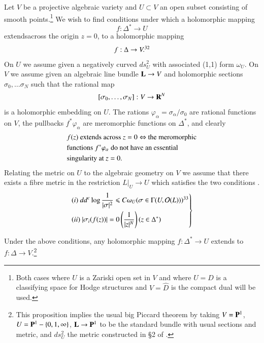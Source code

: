 Let $V$ be a projective algebraic variety and $U \subset V$ an open subset consisting of smooth points.\footnote[31]{Both cases where $U$ is a Zariski open set in $V$ and where $U = D$ is a classifying space for Hodge structures and $V = \hat{D}$ is the compact dual will be used.} We wish to find conditions under which a holomorphic mapping
$$
f : \Delta^\ast \to U
$$
extends\pageoriginale across the origin $z =0$, to a holomorphic mapping
$$
f: \Delta \to V.\footnotemark[32]{}
$$
On $U$ we assume given a negatively curved $ds^2_U$ with associated (1,1) form $\omega_U$. On $V$ we assume given an algebraic line bundle $\mathbf{L} \to V$ and holomorphic sections $\sigma_0, \ldots \sigma_N$ such that the rational map
$$
[\sigma_0, \ldots, \sigma_N]: V \to\mathbf{R}^N
$$
is a holomorphic embedding on $U$. The rations $\varphi_\alpha = \sigma_\alpha / \sigma_0$ are rational functions on $V$, the pullbacks $f^\ast \varphi_\alpha$ are meromorphic functions on $\Delta^\ast$, and clearly
\setcounter{equation}{0}
\begin{align}
& \text{$f(z)$ extends across $z = 0  \Leftrightarrow$ the meromorphic} \notag\\
& \text{functions $f^\ast\varphi_\alpha$ do not have an essential}\notag\\
& \text{singularity at $z = 0$.} \label{art4-eq8.1}
\end{align}
Relating the metric on $U$ to the algebraic geometry on $V$ we assume that there exists a fibre metric in the restriction $L|_U \to U$ which satisfies the two conditions 
.
\begin{equation}
\left.
\begin{aligned}
&  (i)~ dd^c \log \frac{1}{|\sigma|^2} \leqslant C \omega_U (\sigma \in \Gamma (U, \cO (L)))\footnotemark[33]{}\\
& (ii)~ |\sigma_i (f(z))| = 0 \left(\frac{1}{|z|^N} \right) (z \in \Delta^\ast)
\end{aligned}
\right\} \label{art4-eq8.2}
\end{equation}

\begin{proposition}\label{art4-prop8.3}
Under the above conditions, any holomorphic mapping $f : \Delta^\ast \to U$ extends to $f : \Delta \to V$.\footnote[34]{This proposition implies the usual big Piccard theorem by taking $V = \mathbf{P}^1$, $U= \mathbf{P}^1 - \{0, 1, \infty\}$, $\mathbf{L} \to \mathbf{P}^1$ to be the standard bundle with usual sections and metric, and $ds^2_U$ the metric constructed in \S 2 of \cite{art4-key24}.}
\end{proposition}

